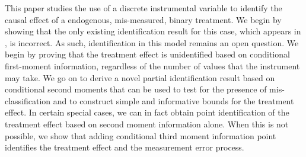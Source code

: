This paper studies the use of a discrete instrumental variable to identify the causal effect of a endogenous, mis-measured, binary treatment.
We begin by showing that the only existing identification result for this case, which appears in \cite{Mahajan}, is incorrect.
As such, identification in this model remains an open question.
We begin by proving that the treatment effect is unidentified based on conditional first-moment information, regardless of the number of values that the instrument may take.
We go on to derive a novel partial identification result based on conditional second moments that can be used to test for the presence of mis-classification and to construct simple and informative bounds for the treatment effect.
In certain special cases, we can in fact obtain point identification of  the treatment effect based on second moment information alone.
When this is not possible, we show that adding conditional third moment information point identifies the treatment effect and the measurement error process.
